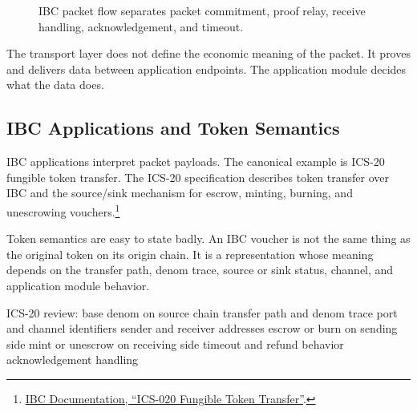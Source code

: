 \begin{figure}[htbp]
\centering
{}
\caption{IBC packet flow separates packet commitment, proof relay, receive handling, acknowledgement, and timeout.}
\end{figure}

The transport layer does not define the economic meaning of the packet. It proves and delivers data between application endpoints. The application module decides what the data does.

\subsection{IBC Applications and Token Semantics}

IBC applications interpret packet payloads. The canonical example is ICS-20 fungible token transfer. The ICS-20 specification describes token transfer over IBC and the source/sink mechanism for escrow, minting, burning, and unescrowing vouchers.\footnote{\href{https://cosmos-docs.mintlify.app/ibc/latest/spec/app/ics-020-fungible-token-transfer/README}{IBC Documentation, ``ICS-020 Fungible Token Transfer''}.}

Token semantics are easy to state badly. An IBC voucher is not the same thing as the original token on its origin chain. It is a representation whose meaning depends on the transfer path, denom trace, source or sink status, channel, and application module behavior.

\begin{codeblock}
ICS-20 review:
    base denom on source chain
    transfer path and denom trace
    port and channel identifiers
    sender and receiver addresses
    escrow or burn on sending side
    mint or unescrow on receiving side
    timeout and refund behavior
    acknowledgement handling
\end{codeblock}

